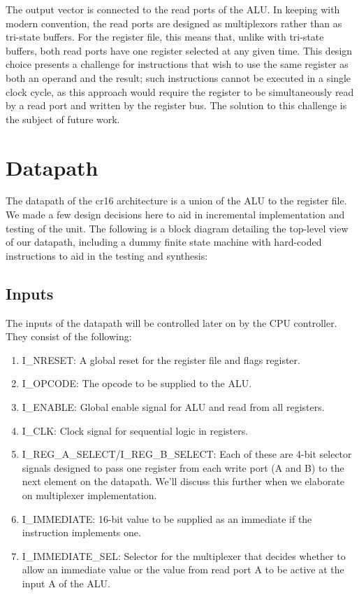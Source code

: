 \documentclass[conference]{IEEEtran}
\begin{document}
The output vector is connected to the read ports of the ALU. In keeping with modern convention, the read ports are designed as multiplexors rather than as tri-state buffers. For the register file, this means that, unlike with tri-state buffers, both read ports have one register selected at any given time. This design choice presents a challenge for instructions that wish to use the same register as both an operand and the result; such instructions cannot be executed in a single clock cycle, as this approach would require the register to be simultaneously read by a read port and written by the register bus. The solution to this challenge is the subject of future work.

\section{Datapath}
The datapath of the cr16 architecture is a union of the ALU to the register file. We made a few design decisions here to aid in incremental implementation and testing of the unit. The following is a block diagram detailing the top-level view of our datapath, including a dummy finite state machine with hard-coded instructions to aid in the testing and synthesis:

\subsection{Inputs}
The inputs of the datapath will be controlled later on by the CPU controller. They consist of the following:
\begin{enumerate}
    \item I\_NRESET: A global reset for the register file and flags register.
    \item I\_OPCODE: The opcode to be supplied to the ALU.
    \item I\_ENABLE: Global enable signal for ALU and read from all registers.
    \item I\_CLK: Clock signal for sequential logic in registers.
    \item I\_REG\_A\_SELECT/I\_REG\_B\_SELECT: Each of these are 4-bit selector signals designed to pass one register from each write port (A and B) to the next element on the datapath. We'll discuss this further when we elaborate on multiplexer implementation.
    \item I\_IMMEDIATE: 16-bit value to be supplied as an immediate if the instruction implements one.
    \item I\_IMMEDIATE\_SEL: Selector for the multiplexer that decides whether to allow an immediate value or the value from read port A to be active at the input A of the ALU.
\end{enumerate}
\end{document}
